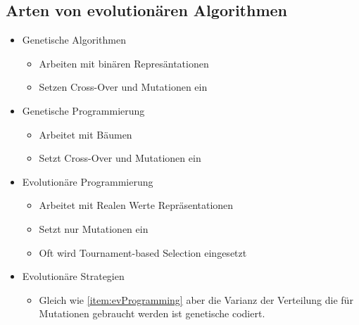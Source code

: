   \subsection{Arten von evolutionären Algorithmen}
  \label{sub:artenEvAlgos}
    \begin{itemize}
      \item Genetische Algorithmen
        \begin{itemize}
          \item Arbeiten mit binären Represäntationen
          \item Setzen Cross-Over und Mutationen ein
        \end{itemize}
      \item Genetische Programmierung
        \begin{itemize}
          \item Arbeitet mit Bäumen
          \item Setzt Cross-Over und Mutationen ein
        \end{itemize}
      \item Evolutionäre Programmierung
      \label{item:evProgramming}
        \begin{itemize}
          \item Arbeitet mit Realen Werte Repräsentationen
          \item Setzt nur Mutationen ein
          \item Oft wird Tournament-based Selection eingesetzt
        \end{itemize}
      \item Evolutionäre Strategien
        \begin{itemize}
          \item Gleich wie \ref{item:evProgramming} aber die Varianz der Verteilung die für Mutationen gebraucht werden ist genetische codiert.
        \end{itemize}
    \end{itemize}

